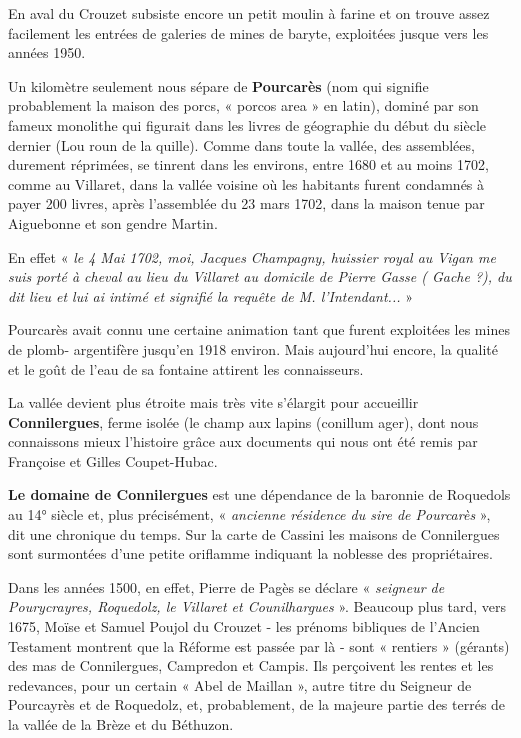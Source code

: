 \vspace{0.2cm}

En aval du Crouzet subsiste encore un petit moulin à farine et on trouve assez facilement les
entrées de galeries de mines de baryte, exploitées jusque vers les années 1950.

\vspace{0.2cm}

Un kilomètre seulement nous sépare de \textbf{Pourcarès} (nom qui signifie probablement la maison
des porcs, « porcos area » en latin), dominé par son fameux monolithe qui figurait dans les
livres de géographie du début du siècle dernier (Lou roun de la quille). Comme dans toute la
vallée, des assemblées, durement réprimées, se tinrent dans les environs, entre 1680 et au
moins 1702, comme au Villaret, dans la vallée voisine où les habitants furent condamnés à
payer 200 livres, après l’assemblée du 23 mars 1702, dans la maison tenue par Aiguebonne et
son gendre Martin.

En effet « \textit{le 4 Mai 1702, moi, Jacques Champagny, huissier royal au Vigan me suis porté à
cheval au lieu du Villaret au domicile de Pierre Gasse ( Gache ?), du dit lieu et lui ai intimé
et signifié la requête de M. l’Intendant...} »

Pourcarès avait connu une certaine animation tant que furent exploitées les mines de plomb-
argentifère jusqu’en 1918 environ. Mais aujourd’hui encore, la qualité et le goût de l’eau de sa
fontaine attirent les connaisseurs.

\vspace{0.2cm}

La vallée devient plus étroite mais très vite s’élargit pour accueillir \textbf{Connilergues}, ferme
isolée (le champ aux lapins (conillum ager), dont nous connaissons mieux l’histoire grâce aux
documents qui nous ont été remis par Françoise et Gilles Coupet-Hubac.

\vspace{0.2cm}

\textbf{Le domaine de Connilergues} est une dépendance de la baronnie de Roquedols au 14° siècle
et, plus précisément, « \textit{ancienne résidence du sire de Pourcarès} », dit une chronique du temps.
Sur la carte de Cassini les maisons de Connilergues sont surmontées d’une petite oriflamme
indiquant la noblesse des propriétaires.

\vspace{0.2cm}

Dans les années 1500, en effet, Pierre de Pagès se déclare « \textit{seigneur de Pourycrayres,
Roquedolz, le Villaret et Counilhargues} ». Beaucoup plus tard, vers 1675, Moïse et Samuel
Poujol du Crouzet - les prénoms bibliques de l’Ancien Testament montrent que la Réforme
est passée par là - sont « rentiers » (gérants) des mas de Connilergues, Campredon et Campis.
Ils perçoivent les rentes et les redevances, pour un certain « Abel de Maillan », autre titre du
Seigneur de Pourcayrès et de Roquedolz, et, probablement, de la majeure partie des terrés
de la vallée de la Brèze et du Béthuzon.

